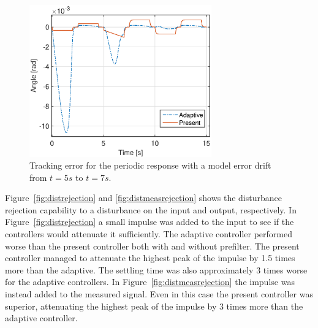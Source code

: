 \begin{figure}[h!]
  \centering
  \includegraphics[width=0.7\textwidth]{fig/matlab/modelerrorperiodic_trackingerror.eps}
  \caption{\label{fig:modelerror_trackingerror} Tracking error for the periodic response with a model error drift from $t=5s$ to $t=7s$.}
\end{figure}

\FloatBarrier
Figure~\ref{fig:distrejection} and \ref{fig:distmeasrejection} shows the disturbance rejection capability to a disturbance on the input and output, respectively. In Figure~\ref{fig:distrejection} a small impulse was added to the input to see if the controllers would attenuate it sufficiently. The adaptive controller performed worse than the present controller both with and without prefilter. The present controller managed to attenuate the highest peak of the impulse by 1.5 times more than the adaptive. The settling time was also approximately 3 times worse for the adaptive controllers. In Figure~\ref{fig:distmeasrejection} the impulse was instead added to the measured signal. Even in this case the present controller was superior, attenuating the highest peak of the impulse by 3 times more than the adaptive controller.

